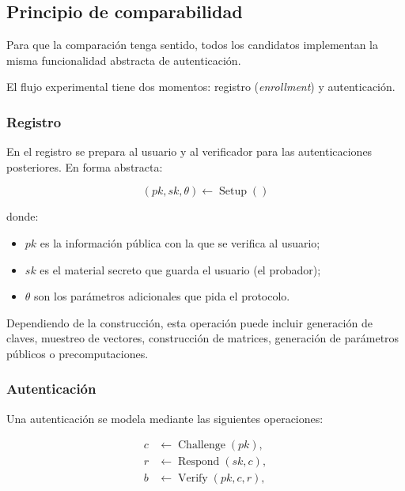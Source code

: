 \subsection{Principio de comparabilidad}
\label{sec:benchmark-comparability}

Para que la comparación tenga sentido, todos los candidatos implementan la misma funcionalidad abstracta de autenticación.

El flujo experimental tiene dos momentos: registro
(\textit{enrollment}) y autenticación.

\subsubsection{Registro}

En el registro se prepara al usuario y al verificador para las autenticaciones posteriores. En forma abstracta:


\begin{equation}
    (pk, sk, \theta) \leftarrow \operatorname{Setup}()
\end{equation}

donde:

\begin{itemize} 
    \item $pk$ es la información pública con la que se verifica al usuario; 
    \item $sk$ es el material secreto que guarda el usuario (el probador); 
    \item $\theta$ son los parámetros adicionales que pida el protocolo. 
\end{itemize}

Dependiendo de la construcción, esta operación puede incluir generación de claves,
muestreo de vectores, construcción de matrices, generación de parámetros públicos o
precomputaciones.

\subsubsection{Autenticación}

Una autenticación se modela mediante las siguientes operaciones:

\begin{align}
    c &\leftarrow \operatorname{Challenge}(pk), \\
    r &\leftarrow \operatorname{Respond}(sk,c), \\
    b &\leftarrow \operatorname{Verify}(pk,c,r),
\end{align}

